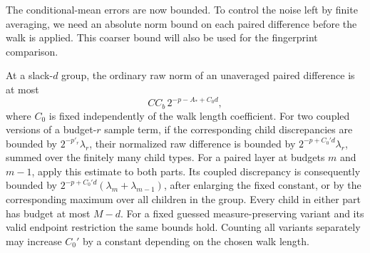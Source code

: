 The conditional-mean errors are now bounded.  To control the noise left
by finite averaging, we need an absolute norm bound on each paired
difference before the walk is applied.  This coarser bound will also be
used for the fingerprint comparison.

\begin{lemma}\label{lem:est-raw-difference}
At a slack-$d$ group, the ordinary raw norm of an unaveraged paired
difference is at most
\begin{equation}
 C C_b\,2^{-p-A_*+C_0d},
 \label{eq:est-raw-bound}
\end{equation}
where $C_0$ is fixed independently of the walk length coefficient.
For two coupled versions of a budget-$r$ sample term, if the
corresponding child discrepancies are bounded by
$2^{-p'_r}\lambda_r$, their normalized raw difference is bounded by
$2^{-p+C_0'd}\lambda_r$, summed over the finitely many child types.
For a paired layer at budgets $m$ and $m-1$, apply this estimate to
both parts. Its coupled discrepancy is consequently bounded by
$2^{-p+C_0'd}(\lambda_m+\lambda_{m-1})$, after enlarging the fixed
constant, or by the corresponding maximum over all children in the
group. Every child in either part has budget at most $M-d$.
For a fixed guessed measure-preserving variant and its valid endpoint
restriction the same bounds hold.  Counting all variants separately may
increase $C_0'$ by a constant depending on the chosen walk length.
\end{lemma}
